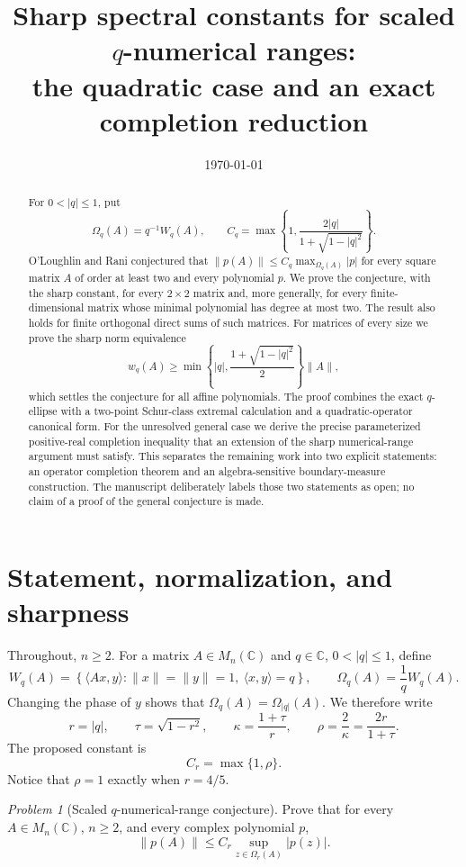 \documentclass[11pt]{article}
\title{Sharp spectral constants for scaled \(q\)-numerical ranges:\\
the quadratic case and an exact completion reduction}
\author{}
\date{\today}
\theoremstyle{remark}
\newtheorem{problem}[theorem]{Problem}
\newcommand{\C}{\mathbb C}
\begin{document}
\maketitle

\begin{abstract}
For \(0<|q|\leq1\), put
\[
 \Omega_q(A)=q^{-1}W_q(A),\qquad
 C_q=\max\left\{1,
 \frac{2|q|}{1+\sqrt{1-|q|^2}}\right\}.
\]
O'Loughlin and Rani conjectured that
\(\|p(A)\|\leq C_q\max_{\Omega_q(A)}|p|\) for every square matrix
\(A\) of order at least two and every polynomial \(p\).
We prove the conjecture, with the sharp constant, for every
\(2\times2\) matrix and, more generally, for every finite-dimensional
matrix whose minimal polynomial has degree at most two.  The result
also holds for finite orthogonal direct sums of such matrices.
For matrices of every size we prove the sharp norm equivalence
\[
 w_q(A)\geq
 \min\left\{|q|,\frac{1+\sqrt{1-|q|^2}}2\right\}\|A\|,
\]
which settles the conjecture for all affine polynomials.
The proof combines the exact \(q\)-ellipse with a two-point
Schur-class extremal calculation and a quadratic-operator canonical
form.  For the unresolved general case we derive the precise
parameterized positive-real completion inequality that an extension
of the sharp numerical-range argument must satisfy.  This separates
the remaining work into two explicit statements: an operator
completion theorem and an algebra-sensitive boundary-measure
construction.  The manuscript deliberately labels those two
statements as open; no claim of a proof of the general conjecture is
made.
\end{abstract}

\section{Statement, normalization, and sharpness}

Throughout, \(n\geq2\).  For a matrix \(A\in M_n(\C)\) and
\(q\in\C\), \(0<|q|\leq1\), define
\[
 W_q(A)=
 \left\{\langle Ax,y\rangle:
 \|x\|=\|y\|=1,\ \langle x,y\rangle=q\right\},
 \qquad
 \Omega_q(A)=\frac1qW_q(A).
\]
Changing the phase of \(y\) shows that
\(\Omega_q(A)=\Omega_{|q|}(A)\).  We therefore write
\[
 r=|q|,\qquad \tau=\sqrt{1-r^2},\qquad
 \kappa=\frac{1+\tau}{r},\qquad
 \rho=\frac2\kappa=\frac{2r}{1+\tau}.
\]
The proposed constant is
\[
 C_r=\max\{1,\rho\}.
\]
Notice that \(\rho=1\) exactly when \(r=4/5\).

\begin{problem}[Scaled \(q\)-numerical-range conjecture]
\label{prob:q-conjecture}
Prove that for every \(A\in M_n(\C)\), \(n\geq2\), and every complex polynomial
\(p\),
\[
 \|p(A)\|\leq C_r\sup_{z\in\Omega_r(A)}|p(z)|.
\]
\end{problem}
\end{document}
